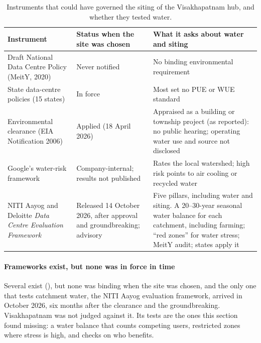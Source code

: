 \begin{table}[t]\centering
\caption{Instruments that could have governed the siting of the Visakhapatnam hub, and whether they tested water.}
\label{tab:frameworks}
\footnotesize\renewcommand{\arraystretch}{1.1}
\begin{tabular}{@{}P{3.6cm}P{4.4cm}P{8.3cm}@{}}
\toprule
Instrument & Status when the site was chosen & What it asks about water and siting \\
\midrule
Draft National Data Centre Policy (MeitY, 2020) & Never notified & No binding environmental requirement
\citep{mongabay2026} \\
State data-centre policies (15 states) & In force & Most set no PUE or WUE standard \citep{mongabay2026} \\
Environmental clearance (EIA Notification 2006) & Applied (18 April 2026) & Appraised as a building or township project (as reported): no public hearing;
operating water use and source not disclosed \citep{mongabay2026,tnm2026} \\
Google's water-risk framework & Company-internal; results not published & Rates the local watershed; high risk points to
air cooling or recycled water \citep{google2026env,afp2026} \\
NITI Aayog and Deloitte \emph{Data Centre Evaluation Framework} & Released 14 October 2026, after approval and groundbreaking; advisory
& Five pillars, including water and siting. A 20--30-year seasonal water balance for each catchment, including farming; ``red zones''
for water stress; MeitY audit; states apply it \citep{niti2026,theprint2026} \\
\bottomrule
\end{tabular}
\end{table}

\paragraph{Frameworks exist, but none was in force in time} Several exist (), but none was binding when the site was chosen, and the only
one that tests catchment water, the NITI Aayog evaluation framework, arrived in October 2026, six months after the clearance
and the groundbreaking. Visakhapatnam was not judged against it. Its tests are the ones this section found missing: a water
balance that counts competing users, restricted zones where stress is high, and checks on who benefits.

